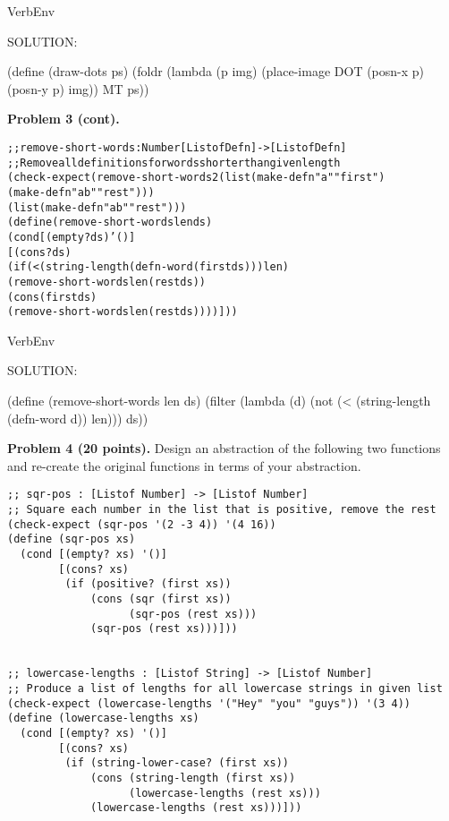 \documentclass[12pt]{article}
\begin{document}
\begin{SaveVerbatim}{VerbEnv}

SOLUTION:

(define (draw-dots ps)
  (foldr (lambda (p img) (place-image DOT (posn-x p) (posn-y p) img))
         MT
         ps))

\end{SaveVerbatim}




\newpage
\noindent
{\bf Problem 3 (cont).}

\begin{alltt}
;; remove-short-words : Number [Listof Defn] -> [Listof Defn]
;; Remove all definitions for words shorter than given length
(check-expect (remove-short-words 2 (list (make-defn "a" "first") 
                                          (make-defn "ab" "rest")))
              (list (make-defn "ab" "rest")))
(define (remove-short-words len ds)
  (cond [(empty? ds) '()]
        [(cons? ds)
         (if (< (string-length (defn-word (first ds))) len)
             (remove-short-words len (rest ds))
             (cons (first ds)
                   (remove-short-words len (rest ds))))]))
\end{alltt}


\begin{SaveVerbatim}{VerbEnv}

SOLUTION:

(define (remove-short-words len ds)
  (filter (lambda (d) (not (< (string-length (defn-word d)) len))) ds))

\end{SaveVerbatim}




\newpage

\noindent
{\bf Problem 4 (20 points).}
%
Design an abstraction of the following two functions and re-create
the original functions in terms of your abstraction.

\begin{verbatim}
;; sqr-pos : [Listof Number] -> [Listof Number]
;; Square each number in the list that is positive, remove the rest
(check-expect (sqr-pos '(2 -3 4)) '(4 16))
(define (sqr-pos xs)
  (cond [(empty? xs) '()]
        [(cons? xs)
         (if (positive? (first xs))
             (cons (sqr (first xs))
                   (sqr-pos (rest xs)))
             (sqr-pos (rest xs)))]))


;; lowercase-lengths : [Listof String] -> [Listof Number]
;; Produce a list of lengths for all lowercase strings in given list
(check-expect (lowercase-lengths '("Hey" "you" "guys")) '(3 4))
(define (lowercase-lengths xs)
  (cond [(empty? xs) '()]
        [(cons? xs)
         (if (string-lower-case? (first xs))
             (cons (string-length (first xs))
                   (lowercase-lengths (rest xs)))
             (lowercase-lengths (rest xs)))]))
\end{verbatim}
\end{document}
